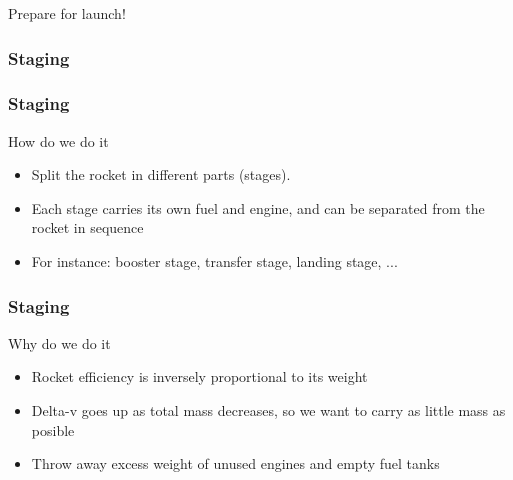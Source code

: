 {
\begin{frame}
    \begin{block}{}
        \begin{center}
            Prepare for launch!
        \end{center}
    \end{block}
\end{frame}
%
\begin{frame}
    \frametitle{Staging}
\end{frame}
\begin{frame}
    \frametitle{Staging}
    \begin{block}{How do we do it}
        \begin{itemize}
            \item Split the rocket in different parts (stages).
            \item Each stage carries its own fuel and engine, and can be separated from the rocket in sequence
            \item For instance: booster stage, transfer stage, landing stage, ...
        \end{itemize}
    \end{block}
\end{frame}
\begin{frame}
    \frametitle{Staging}
    \begin{block}{Why do we do it}
        \begin{itemize}
            \item Rocket efficiency is inversely proportional to its weight
            \item Delta-v goes up as total mass decreases, so we want to carry as little mass as posible
            \item Throw away excess weight of unused engines and empty fuel tanks
        \end{itemize}
    \end{block}
\end{frame}
}

